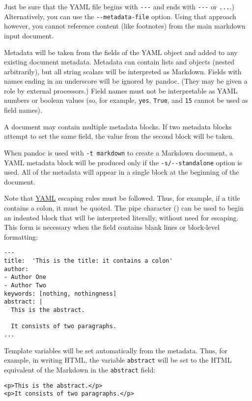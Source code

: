 \documentclass[]{article}
\begin{document}
Just be sure that the YAML file begins with \texttt{-\/-\/-} and ends
with \texttt{-\/-\/-} or \texttt{...}.) Alternatively, you can use the
\texttt{-\/-metadata-file} option. Using that approach however, you
cannot reference content (like footnotes) from the main markdown input
document.

Metadata will be taken from the fields of the YAML object and added to
any existing document metadata. Metadata can contain lists and objects
(nested arbitrarily), but all string scalars will be interpreted as
Markdown. Fields with names ending in an underscore will be ignored by
pandoc. (They may be given a role by external processors.) Field names
must not be interpretable as YAML numbers or boolean values (so, for
example, \texttt{yes}, \texttt{True}, and \texttt{15} cannot be used as
field names).

A document may contain multiple metadata blocks. If two metadata blocks
attempt to set the same field, the value from the second block will be
taken.

When pandoc is used with \texttt{-t\ markdown} to create a Markdown
document, a YAML metadata block will be produced only if the
\texttt{-s/-\/-standalone} option is used. All of the metadata will
appear in a single block at the beginning of the document.

Note that \href{https://yaml.org/spec/1.2/spec.html}{YAML} escaping
rules must be followed. Thus, for example, if a title contains a colon,
it must be quoted. The pipe character (\texttt{\textbar{}}) can be used
to begin an indented block that will be interpreted literally, without
need for escaping. This form is necessary when the field contains blank
lines or block-level formatting:

\begin{verbatim}
---
title:  'This is the title: it contains a colon'
author:
- Author One
- Author Two
keywords: [nothing, nothingness]
abstract: |
  This is the abstract.

  It consists of two paragraphs.
...
\end{verbatim}

Template variables will be set automatically from the metadata. Thus,
for example, in writing HTML, the variable \texttt{abstract} will be set
to the HTML equivalent of the Markdown in the \texttt{abstract} field:

\begin{verbatim}
<p>This is the abstract.</p>
<p>It consists of two paragraphs.</p>
\end{verbatim}
\end{document}

